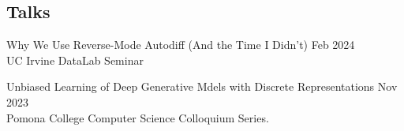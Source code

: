 \documentclass[margin]{res}
\begin{document}
\begin{resume}



%
%

 

\section{Talks}

Why We Use Reverse-Mode Autodiff (And the Time I Didn't) \hfill Feb 2024\\ 
UC Irvine DataLab Seminar

Unbiased Learning of Deep Generative Mdels with Discrete Representations \hfill Nov 2023\\ 
Pomona College Computer Science Colloquium Series.


\end{resume}
\end{document}
